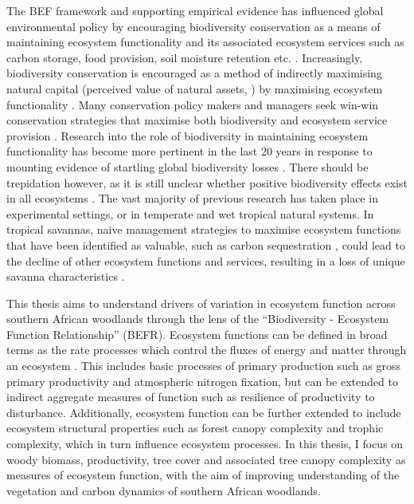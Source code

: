 \begin{refsection}
The BEF framework and supporting empirical evidence has influenced global environmental policy by encouraging biodiversity conservation as a means of maintaining ecosystem functionality and its associated ecosystem services such as carbon storage, food provision, soil moisture retention etc. \citep{Balvanera2014, Naeem2012}. Increasingly, biodiversity conservation is encouraged as a method of indirectly maximising natural capital (perceived value of natural assets, \citealt{Kareiva2011}) by maximising ecosystem functionality \citep{Scherer-Lorenzen2014, Cardinale2012}. Many conservation policy makers and managers seek win-win conservation strategies that maximise both biodiversity and ecosystem service provision \citep{Howe2014, Adams2004}. Research into the role of biodiversity in maintaining ecosystem functionality has become more pertinent in the last 20 years in response to mounting evidence of startling global biodiversity losses \citep{McRae2017, Butchart2010, Vitousek1997}. There should be trepidation however, as it is still unclear whether positive biodiversity effects exist in all ecosystems \citep{Sheil2020}. The vast majority of previous research has taken place in experimental settings, or in temperate and wet tropical natural systems. In tropical savannas, naive management strategies to maximise ecosystem functions that have been identified as valuable, such as carbon sequestration \citep{Duffy2017}, could lead to the decline of other ecosystem functions and services, resulting in a loss of unique savanna characteristics \citep{Brockerhoff2017, Srivastava2005a}. 

This thesis aims to understand drivers of variation in ecosystem function across southern African woodlands through the lens of the ``Biodiversity - Ecosystem Function Relationship'' (BEFR). Ecosystem functions can be defined in broad terms as the rate processes which control the fluxes of energy and matter through an ecosystem \citep{Jax2005}. This includes basic processes of primary production such as gross primary productivity and atmospheric nitrogen fixation, but can be extended to indirect aggregate measures of function such as resilience of productivity to disturbance. Additionally, ecosystem function can be further extended to include ecosystem structural properties such as forest canopy complexity and trophic complexity, which in turn influence ecosystem processes. In this thesis, I focus on woody biomass, productivity, tree cover and associated tree canopy complexity as measures of ecosystem function, with the aim of improving understanding of the vegetation and carbon dynamics of southern African woodlands.


\end{refsection}
